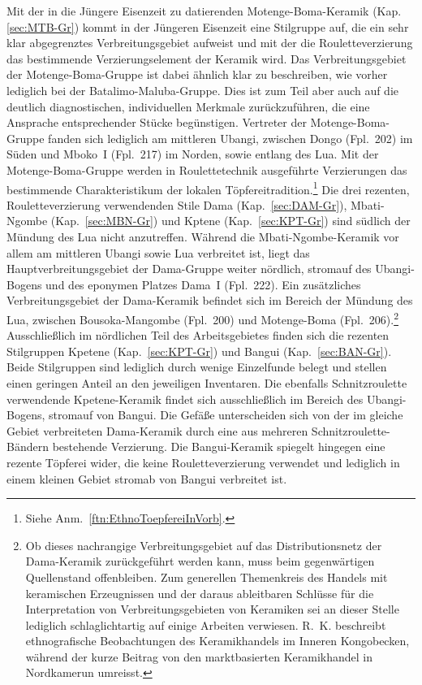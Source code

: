 Mit der in die Jüngere Eisenzeit zu datierenden Motenge-Boma-Keramik (Kap. \ref{sec:MTB-Gr}) kommt in der Jüngeren Eisenzeit eine Stilgruppe auf, die ein sehr klar abgegrenztes Verbreitungsgebiet aufweist und mit der die Rouletteverzierung das bestimmende Verzierungselement der Keramik wird. Das Verbreitungsgebiet der Motenge-Boma-Gruppe ist dabei ähnlich klar zu beschreiben, wie vorher lediglich bei der Batalimo-Maluba-Gruppe. Dies ist zum Teil aber auch auf die deutlich diagnostischen, individuellen Merkmale zurückzuführen, die eine Ansprache entsprechender Stücke begünstigen. Vertreter der Motenge-Boma-Gruppe fanden sich lediglich am mittleren \mbox{Ubangi}, zwischen Dongo (Fpl.~202) im Süden und Mboko~I (Fpl.~217) im Norden, sowie entlang des Lua. Mit der Motenge-Boma-Gruppe werden in Roulettetechnik ausgeführte Verzierungen das bestimmende Charakteristikum der lokalen Töpfereitradition.\footnote{Siehe Anm.~\ref{ftn:EthnoToepfereiInVorb}.} Die drei rezenten, Rouletteverzierung verwendenden Stile Dama (Kap.~\ref{sec:DAM-Gr}), Mbati-Ngombe (Kap.~\ref{sec:MBN-Gr}) und Kptene (Kap.~\ref{sec:KPT-Gr}) sind südlich der Mündung des Lua nicht anzutreffen. Während die Mbati-Ngombe-Keramik vor allem am mittleren \mbox{Ubangi} sowie Lua verbreitet ist, liegt das Hauptverbreitungsgebiet der Dama-Gruppe weiter nördlich, stromauf des \mbox{Ubangi}-Bogens und des eponymen Platzes Dama~I (Fpl.~222). Ein zusätzliches Verbreitungsgebiet der Dama-Keramik befindet sich im Bereich der Mündung des Lua, zwischen Bousoka-Mangombe (Fpl.~200) und Motenge-Boma (Fpl.~206).\footnote{Ob dieses nachrangige Verbreitungsgebiet auf das Distributionsnetz der Dama-Keramik zurückgeführt werden kann, muss beim gegenwärtigen Quellenstand offenbleiben. Zum generellen Themenkreis des Handels mit keramischen Erzeugnissen und der daraus ableitbaren Schlüsse für die Interpretation von Verbreitungsgebieten von Keramiken sei an dieser Stelle lediglich schlaglichtartig auf einige Arbeiten verwiesen. R.~K. \textcite{Eggert.1991} beschreibt ethnografische Beobachtungen des Keramikhandels im Inneren Kongobecken, während der kurze Beitrag von \textcite{VanderLinden.1996} den marktbasierten Keramikhandel in Nordkamerun umreisst.} Ausschließlich im nördlichen Teil des Arbeitsgebietes finden sich die rezenten Stilgruppen Kpetene (Kap.~\ref{sec:KPT-Gr}) und Bangui (Kap.~\ref{sec:BAN-Gr}). Beide Stilgruppen sind lediglich durch wenige Einzelfunde belegt und stellen einen geringen Anteil an den jeweiligen Inventaren. Die ebenfalls Schnitzroulette verwendende Kpetene-Keramik findet sich ausschließlich im Bereich des \mbox{Ubangi}-Bogens, stromauf von Bangui. Die Gefäße unterscheiden sich von der im gleiche Gebiet verbreiteten Dama-Keramik durch eine aus mehreren Schnitzroulette-Bändern bestehende Verzierung. Die Bangui-Keramik spiegelt hingegen eine rezente Töpferei wider, die keine Rouletteverzierung verwendet und lediglich in einem kleinen Gebiet stromab von Bangui verbreitet ist.


